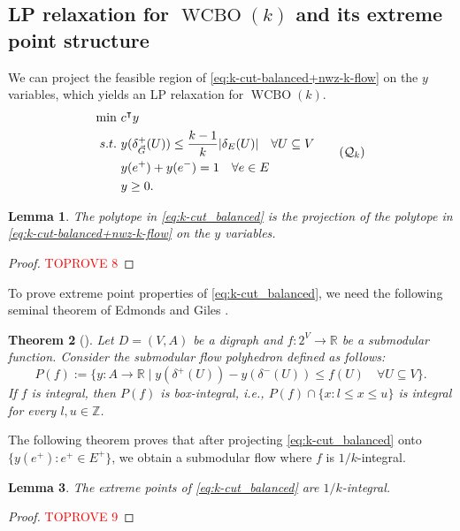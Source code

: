 \documentclass[11pt]{article}
\newtheorem{theorem}{Theorem}
\newtheorem{lemma}[theorem]{Lemma}
\newcommand{\Z}{\mathbb{Z}}
\newcommand{\R}{\mathbb{R}}
\begin{document}
\subsection{LP relaxation for $\operatorname{WCBO}(k)$ and its extreme point structure}\label{sec:WCBO-LP}
We can project the feasible region of \eqref{eq:k-cut-balanced+nwz-k-flow} on the $y$ variables, which yields an LP relaxation for $\operatorname{WCBO}(k)$.
\begin{equation}\label{eq:k-cut_balanced}
\begin{aligned}
    \min~&c^\intercal y\\
    s.t.~&y(\delta_{\vec{G}}^+(U))\leq \frac{k-1}{k}|\delta_E(U)|\quad \forall U\subseteq V\\
    &y(e^+)+y(e^-)=1\quad \forall e\in E\\
        &y\geq 0.
\end{aligned}\tag{$\mathcal{Q}_k$}
\end{equation}

\begin{lemma}\label{lemma:proj-y}
    The polytope in \eqref{eq:k-cut_balanced} is the projection of the polytope in \eqref{eq:k-cut-balanced+nwz-k-flow} on the $y$ variables.
\end{lemma}
\begin{proof}\textcolor{red}{TOPROVE 8}\end{proof}
To prove extreme point properties of \eqref{eq:k-cut_balanced}, we need the following seminal theorem of Edmonds and Giles \cite{edmonds1977min}.
\begin{theorem}[\cite{edmonds1977min}]\label{thm:submodular_flow}
    Let $D=(V,A)$ be a digraph and $f:2^V\rightarrow \R$ be a submodular function. Consider the \emph{submodular flow} polyhedron defined as follows:
    \[
P(f):=\big\{y: A\rightarrow \R \mid y(\delta^+(U))-y(\delta^-(U))\leq f(U)\quad \forall U\subseteq V\big\}.
\]
If $f$ is integral, then $P(f)$ is  \emph{box-integral}, i.e., $P(f)\cap \{x: l\leq x\leq u\}$ is integral for every $l,u\in \Z$. 
\end{theorem}
The following theorem proves that after projecting \eqref{eq:k-cut_balanced} onto $\{y(e^+): e^+\in E^+\}$, we obtain a submodular flow where $f$ is $1/k$-integral.
\begin{lemma}\label{lemma:1/k-integral}
    The extreme points of \eqref{eq:k-cut_balanced} are $1/k$-integral.
\end{lemma}
\begin{proof}\textcolor{red}{TOPROVE 9}\end{proof}
    
\end{document}
